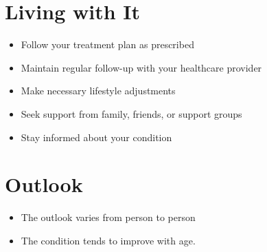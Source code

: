 \section{Living with It}
\begin{itemize}[noitemsep]
  \item Follow your treatment plan as prescribed
  \item Maintain regular follow-up with your healthcare provider
  \item Make necessary lifestyle adjustments
  \item Seek support from family, friends, or support groups
  \item Stay informed about your condition
\end{itemize}
\section{Outlook}
\begin{itemize}[noitemsep]
  \item The outlook varies from person to person
  \item The condition tends to improve with age.
\end{itemize}
